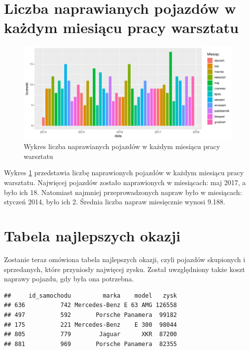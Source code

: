\documentclass{article}\usepackage[]{graphicx}\usepackage[]{xcolor}
\makeatletter
\def\maxwidth{ %
  \ifdim\Gin@nat@width>\linewidth
    \linewidth
  \else
    \Gin@nat@width
  \fi
}
\newenvironment{kframe}{%
 \def\at@end@of@kframe{}%
 \ifinner\ifhmode%
  \def\at@end@of@kframe{\end{minipage}}%
  \begin{minipage}{\columnwidth}%
 \fi\fi%
 \def\FrameCommand##1{\hskip\@totalleftmargin \hskip-\fboxsep
 \colorbox{shadecolor}{##1}\hskip-\fboxsep
     \hskip-\linewidth \hskip-\@totalleftmargin \hskip\columnwidth}%
 \MakeFramed {\advance\hsize-\width
   \@totalleftmargin\z@ \linewidth\hsize
   \@setminipage}}%
 {\par\unskip\endMakeFramed%
 \at@end@of@kframe}
\newenvironment{knitrout}{}{} %
\makeatother
\begin{document}
\section{Liczba naprawianych pojazdów w każdym miesiącu pracy warsztatu}

\begin{knitrout}
\color{fgcolor}\begin{figure}[H]

{\centering \includegraphics[width=\maxwidth]{figure/fig_naprawy_miesiecznie-1} 

}

\caption[Wykres liczba naprawianych pojazdów w każdym miesiącu pracy warsztatu]{Wykres liczba naprawianych pojazdów w każdym miesiącu pracy warsztatu}\label{fig:fig_naprawy_miesiecznie}
\end{figure}

\end{knitrout}

Wykres \ref{fig:fig_naprawy_miesiecznie} przedstawia liczbę naprawionych pojazdów w każdym miesiącu pracy warsztatu. Najwięcej pojazdów zostało naprawionych w miesiącach: 
maj 2017,
a było ich 18. Natomiast najmniej przeprowadzonych napraw było w miesiącach:
styczeń 2014,
było ich 2. Średnia liczba napraw miesięcznie wynosi 
9.188. 

\section{Tabela najlepszych okazji}

Zostanie teraz omówiona tabela najlepszych okazji, czyli pojazdów skupionych i sprzedanych, które przyniosły najwięcej zysku. Został uwzględniony także koszt naprawy pojazdu, gdy była ona potrzebna.





\begin{knitrout}
\color{fgcolor}\begin{kframe}
\begin{verbatim}
##     id_samochodu         marka    model   zysk
## 636          742 Mercedes-Benz E 63 AMG 126558
## 497          592       Porsche Panamera  99182
## 175          221 Mercedes-Benz    E 300  98044
## 805          779        Jaguar      XKR  87200
## 881          969       Porsche Panamera  82355
\end{verbatim}
\end{kframe}
\end{knitrout}
\end{document}
